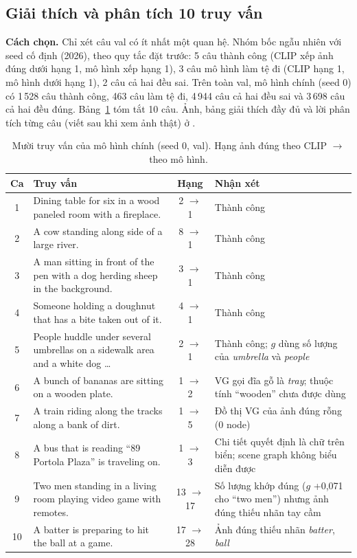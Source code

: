 \subsection{Giải thích và phân tích 10 truy vấn}
\label{sec:l1-cases}

\textbf{Cách chọn.} Chỉ xét câu val có ít nhất một quan hệ. Nhóm bốc ngẫu nhiên với seed cố định (2026), theo quy tắc đặt
trước: 5 câu thành công (CLIP xếp ảnh đúng dưới hạng 1, mô hình xếp hạng 1), 3 câu mô hình làm tệ đi (CLIP hạng 1, mô hình
dưới hạng 1), 2 câu cả hai đều sai. Trên toàn val, mô hình chính (seed 0) có 1\,528 câu thành công, 463 câu làm tệ đi,
4\,944 câu cả hai đều sai và 3\,698 câu cả hai đều đúng. Bảng~\ref{tab:l1-cases} tóm tắt 10 câu. Ảnh, bảng giải thích đầy
đủ và lời phân tích từng câu (viết sau khi xem ảnh thật) ở .

\begin{table}[t]
\centering
\caption{Mười truy vấn của mô hình chính (seed 0, val). Hạng ảnh đúng theo CLIP $\to$ theo mô hình.}
\label{tab:l1-cases}
\footnotesize
\begin{tabular}{cp{7.6cm}cp{6.0cm}}
\toprule
Ca & Truy vấn & Hạng & Nhận xét \\
\midrule
1 & Dining table for six in a wood paneled room with a fireplace. & 2 $\to$ 1 & Thành công \\
2 & A cow standing along side of a large river. & 8 $\to$ 1 & Thành công \\
3 & A man sitting in front of the pen with a dog herding sheep in the background. & 3 $\to$ 1 & Thành công \\
4 & Someone holding a doughnut that has a bite taken out of it. & 4 $\to$ 1 & Thành công \\
5 & People huddle under several umbrellas on a sidewalk area and a white dog \dots & 2 $\to$ 1 & Thành công; $g$ dùng số lượng của \emph{umbrella} và \emph{people} \\
6 & A bunch of bananas are sitting on a wooden plate. & 1 $\to$ 2 & VG gọi đĩa gỗ là \emph{tray}; thuộc tính ``wooden'' chưa được dùng \\
7 & A train riding along the tracks along a bank of dirt. & 1 $\to$ 5 & Đồ thị VG của ảnh đúng rỗng (0 node) \\
8 & A bus that is reading ``89 Portola Plaza'' is traveling on. & 1 $\to$ 3 & Chi tiết quyết định là chữ trên biển; scene graph không biểu diễn được \\
9 & Two men standing in a living room playing video game with remotes. & 13 $\to$ 17 & Số lượng khớp đúng ($g$ +0,071 cho ``two men'') nhưng ảnh đúng thiếu nhãn tay cầm \\
10 & A batter is preparing to hit the ball at a game. & 17 $\to$ 28 & Ảnh đúng thiếu nhãn \emph{batter}, \emph{ball} \\
\bottomrule
\end{tabular}
\end{table}

